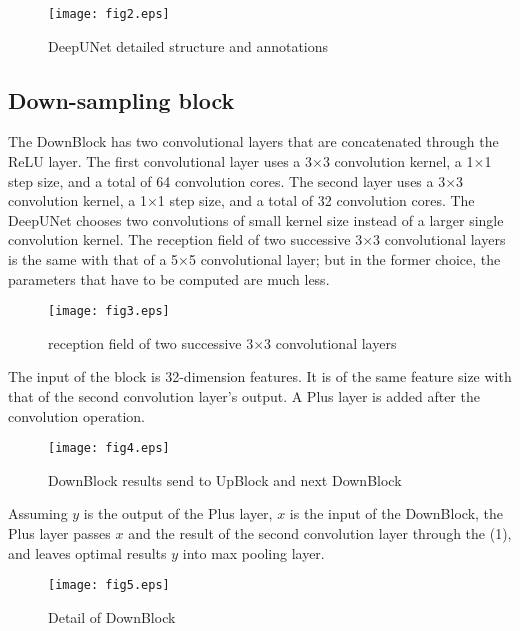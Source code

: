 \documentclass[conference]{IEEEtran}
\begin{document}
\begin{figure*}[htbp]
\setlength{\abovecaptionskip}{0pt}
\setlength{\belowcaptionskip}{-10pt}
\centering
\texttt{[image: fig2.eps]}
\caption{DeepUNet detailed structure and annotations}
\label{fig2}
\end{figure*}

\subsection{Down-sampling block}

The DownBlock has two convolutional layers that are concatenated through the ReLU layer. The first convolutional layer uses a 3$\times$3 convolution kernel, a 1$\times$1 step size, and a total of 64 convolution cores. The second layer uses a 3$\times$3 convolution kernel, a 1$\times$1 step size, and a total of 32 convolution cores. The DeepUNet chooses two convolutions of small kernel size instead of a larger single convolution kernel. The reception field of two successive 3$\times$3 convolutional layers is the same with that of a 5$\times$5 convolutional layer; but in the former choice, the parameters that have to be computed are much less.\\

\begin{figure}[htbp]
\setlength{\abovecaptionskip}{0pt}
\setlength{\belowcaptionskip}{-10pt}
\centering
\texttt{[image: fig3.eps]}
\caption{reception field of two successive 3$\times$3 convolutional layers}
\label{fig3}
\end{figure}

The input of the block is 32-dimension features. It is of the same feature size with that of the second convolution layer’s output. A Plus layer is added after the convolution operation. 

\begin{figure}[htbp]
\setlength{\abovecaptionskip}{0pt}
\setlength{\belowcaptionskip}{-10pt}
\centering
\texttt{[image: fig4.eps]}
\caption{DownBlock results send to UpBlock and next DownBlock}
\label{fig4}
\end{figure}

Assuming $y$ is the output of the Plus layer, $x$ is the input of the DownBlock, the Plus layer passes $x$ and the result of the second convolution layer through the (1), and leaves optimal results $y$ into max pooling layer. \\

\begin{figure}[htbp]
\setlength{\abovecaptionskip}{0pt}
\setlength{\belowcaptionskip}{-10pt}
\centering
\texttt{[image: fig5.eps]}
\caption{Detail of DownBlock}
\label{fig5}
\end{figure}
\end{document}
